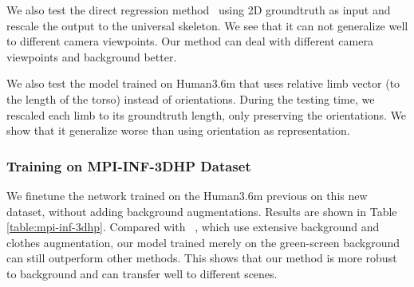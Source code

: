 \documentclass{bmvc2k}
\begin{document}
We also test the direct regression method~\cite{martinez2017simple} using 2D groundtruth as input and rescale the output to the universal skeleton. We see that it can not generalize well to different camera viewpoints. Our method can deal with different camera viewpoints and background better. 

We also test the model trained on Human3.6m that uses relative limb vector (to the length of the torso) instead of orientations. During the testing time, we rescaled each limb to its groundtruth length, only preserving the orientations. We show that it generalize worse than using orientation as representation.

\subsubsection{Training on MPI-INF-3DHP Dataset}

We finetune the network trained on the Human3.6m previous on this new dataset, without adding background augmentations. Results are shown in Table \ref{table:mpi-inf-3dhp}. Compared with ~\cite{mono-3dhp2017,VNect_SIGGRAPH2017}, which use extensive background and clothes augmentation, our model trained merely on the green-screen background can still outperform other methods. This shows that our method is more robust to background and can transfer well to different scenes.
\end{document}
